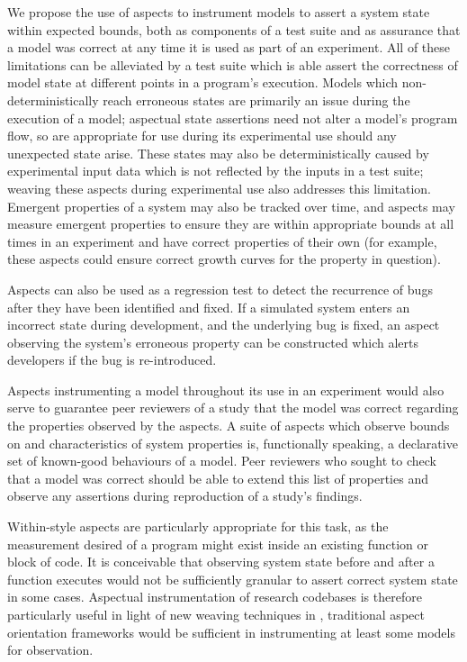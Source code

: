 We propose the use of aspects to instrument models to assert a system state
within expected bounds, both as components of a test suite and as assurance that
a model was correct at any time it is used as part of an experiment. All of
these limitations can be alleviated by a test suite which is able assert the
correctness of model state at different points in a program's execution. Models
which non-deterministically reach erroneous states are primarily an issue during
the execution of a model; aspectual state assertions need not alter a model's
program flow, so are appropriate for use during its experimental use should any
unexpected state arise. These states may also be deterministically caused by
experimental input data which is not reflected by the inputs in a test suite;
weaving these aspects during experimental use also addresses this limitation.
Emergent properties of a system may also be tracked over time, and aspects may
measure emergent properties to ensure they are within appropriate bounds at all
times in an experiment and have correct properties of their own (for example,
these aspects could ensure correct growth curves for the property in question).

Aspects can also be used as a regression test to detect the recurrence of bugs
after they have been identified and fixed. If a simulated system enters an
incorrect state during development, and the underlying bug is fixed, an aspect
observing the system's erroneous property can be constructed which alerts
developers if the bug is re-introduced.

Aspects instrumenting a model throughout its use in an experiment would also
serve to guarantee peer reviewers of a study that the model was correct
regarding the properties observed by the aspects. A suite of aspects which
observe bounds on and characteristics of system properties is, functionally
speaking, a declarative set of known-good behaviours of a model. Peer reviewers
who sought to check that a model was correct should be able to extend this list
of properties and observe any assertions during reproduction of a study's
findings.

Within-style aspects are particularly appropriate for this task, as the
measurement desired of a program might exist inside an existing function or
block of code. It is conceivable that observing system state before and after a
function executes would not be sufficiently granular to assert correct system
state in some cases. Aspectual instrumentation of research codebases is
therefore particularly useful in light of new weaving techniques in \pdsf,
traditional aspect orientation frameworks would be sufficient in instrumenting
at least some models for observation.

